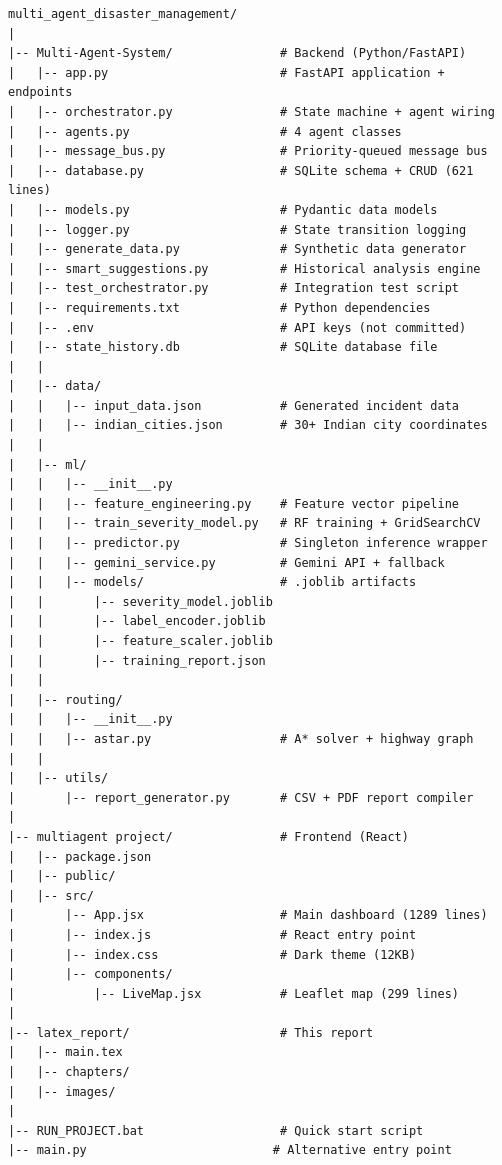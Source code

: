 \begin{lstlisting}[style=pseudocode, caption=Complete project folder structure]
multi_agent_disaster_management/
|
|-- Multi-Agent-System/               # Backend (Python/FastAPI)
|   |-- app.py                        # FastAPI application + endpoints
|   |-- orchestrator.py               # State machine + agent wiring
|   |-- agents.py                     # 4 agent classes
|   |-- message_bus.py                # Priority-queued message bus
|   |-- database.py                   # SQLite schema + CRUD (621 lines)
|   |-- models.py                     # Pydantic data models
|   |-- logger.py                     # State transition logging
|   |-- generate_data.py              # Synthetic data generator
|   |-- smart_suggestions.py          # Historical analysis engine
|   |-- test_orchestrator.py          # Integration test script
|   |-- requirements.txt              # Python dependencies
|   |-- .env                          # API keys (not committed)
|   |-- state_history.db              # SQLite database file
|   |
|   |-- data/
|   |   |-- input_data.json           # Generated incident data
|   |   |-- indian_cities.json        # 30+ Indian city coordinates
|   |
|   |-- ml/
|   |   |-- __init__.py
|   |   |-- feature_engineering.py    # Feature vector pipeline
|   |   |-- train_severity_model.py   # RF training + GridSearchCV
|   |   |-- predictor.py              # Singleton inference wrapper
|   |   |-- gemini_service.py         # Gemini API + fallback
|   |   |-- models/                   # .joblib artifacts
|   |       |-- severity_model.joblib
|   |       |-- label_encoder.joblib
|   |       |-- feature_scaler.joblib
|   |       |-- training_report.json
|   |
|   |-- routing/
|   |   |-- __init__.py
|   |   |-- astar.py                  # A* solver + highway graph
|   |
|   |-- utils/
|       |-- report_generator.py       # CSV + PDF report compiler
|
|-- multiagent project/               # Frontend (React)
|   |-- package.json
|   |-- public/
|   |-- src/
|       |-- App.jsx                   # Main dashboard (1289 lines)
|       |-- index.js                  # React entry point
|       |-- index.css                 # Dark theme (12KB)
|       |-- components/
|           |-- LiveMap.jsx           # Leaflet map (299 lines)
|
|-- latex_report/                     # This report
|   |-- main.tex
|   |-- chapters/
|   |-- images/
|
|-- RUN_PROJECT.bat                   # Quick start script
|-- main.py                          # Alternative entry point
\end{lstlisting}

